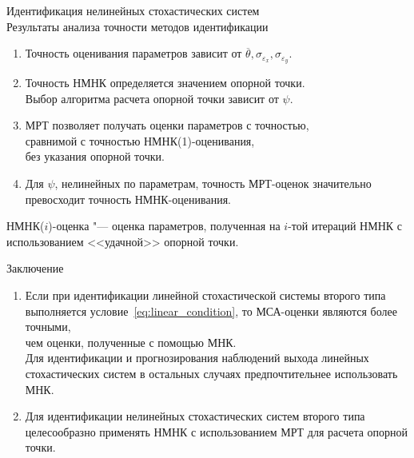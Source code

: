 \documentclass[hyperref={pdftex,unicode}]{beamer}
\begin{document}
\begin{frame}{%
    Идентификация нелинейных стохастических систем \\
    \small{Результаты анализа точности методов идентификации}
  }
  \begin{enumerate}
  \item Точность оценивания параметров зависит от
    \( \overline{\theta}, \sigma_{\varepsilon_x}, \sigma_{\varepsilon_y} \).
  \item Точность НМНК определяется значением опорной точки. \\
    Выбор алгоритма расчета опорной точки зависит от \( \psi \).
  \item МРТ позволяет получать оценки параметров с точностью, \\
    сравнимой с точностью НМНК(1)-оценивания, \\
    без указания опорной точки.
  \item Для \( \psi \), нелинейных по параметрам,
    точность МРТ-оценок значительно превосходит точность НМНК-оценивания.
  \end{enumerate}

  \bigskip
  \scriptsize{%
    НМНК(\( i \))-оценка
    "--- оценка параметров, полученная на \( i \)-той итераций НМНК
    с использованием <<удачной>> опорной точки.
  }
\end{frame}

\begin{frame}{Заключение}
  \begin{enumerate}
  \item Если при идентификации линейной стохастической системы
    второго типа выполняется условие~\eqref{eq:linear_condition}, то
    МСА-оценки являются более точными, \\
    чем оценки, полученные с помощью МНК. \\
    Для идентификации и прогнозирования наблюдений выхода
    линейных стохастических систем в остальных случаях предпочтительнее
    использовать МНК.
  \item Для идентификации нелинейных стохастических систем второго типа
    целесообразно применять НМНК с использованием МРТ для расчета опорной точки.
  \end{enumerate}
\end{frame}
\end{document}
